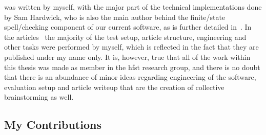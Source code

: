 \documentclass[officiallayout]{unihelcompling}
\begin{document}
was written by myself, with the major part of the technical implementations
done by Sam Hardwick, who is also the main author behind the finite\-/state
spell\-/checking component of our current software, as is further detailed
in~\citet{linden2011hfst}.  In the
articles~ the majority
of the test setup, article structure, engineering and other tasks were
performed by myself, which is reflected in the fact that they are published
under my name only. It is, however, true that all of the work within this
thesis was made as member in the \gls{hfst} research group, and there is no
doubt that there is an abundance of minor ideas regarding engineering of the
software, evaluation setup and article writeup that are the creation of
collective brainstorming as well.

\subsection{My Contributions}
\label{subsec:contributions}
\end{document}
